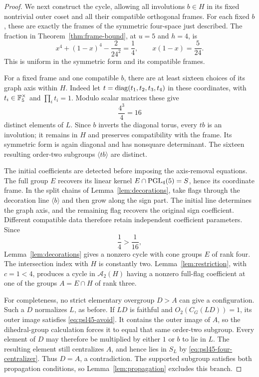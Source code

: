 \begin{proof}
We next construct the cycle, allowing all involutions $b\in H$
in its fixed nontrivial outer coset and all their compatible
orthogonal frames. For each fixed $b$, these are exactly the
frames of the symmetric four-space just described. The fraction
in Theorem~\ref{thm:frame-bound}, at $u=5$ and $h=4$, is
\[
 x^4+(1-x)^4-\frac{2}{24^2}=\frac14,
 \qquad x(1-x)=\frac5{24}.
\]
This is uniform in the symmetric form and its compatible frames.

For a fixed frame and one compatible $b$, there are at least
sixteen choices of its graph axis within $H$. Indeed let
$t=\operatorname{diag}(t_1,t_2,t_3,t_4)$ in these coordinates, with
$t_i\in\mathbb F_5^\times$ and $\prod_i t_i=1$.
Modulo scalar matrices these give
\[
 \frac{4^3}{4}=16
\]
distinct elements of $L$. Since $b$ inverts the diagonal torus,
every $tb$ is an involution; it remains in $H$ and preserves
compatibility with the frame. Its symmetric form is again
diagonal and has nonsquare determinant. The sixteen resulting
order-two subgroups $\langle tb\rangle$ are distinct.

The initial coefficients are detected before imposing the
axis-removal equations. The full group $E$ recovers its linear
kernel $E\cap\operatorname{PGL}_4(5)=S$, hence its coordinate frame. In the
split chains of Lemma~\ref{lem:decorations}, take flags through
the decoration line $\langle b\rangle$ and then grow along the
sign part. The initial line determines the graph axis, and the
remaining flag recovers the original sign coefficient. Different
compatible data therefore retain independent coefficient
parameters. Since
\[
 \frac14>\frac1{16},
\]
Lemma~\ref{lem:decorations} gives a nonzero cycle with cone groups
$E$ of rank four. The intersection index with $H$ is constantly
two. Lemma~\ref{lem:restriction}, with $c=1<4$, produces a cycle
in $\mathcal A_2(H)$ having a nonzero full-flag coefficient at
one of the groups $A=E\cap H$ of rank three.

For completeness, no strict elementary overgroup $D>A$ can
give a configuration. Such a $D$ normalizes $L$, as before.
If $LD$ is faithful and $O_2(C_G(LD))=1$, its outer image
satisfies \eqref{eq:psl45-avoid}. It contains the outer image of
$A$, so the dihedral-group calculation forces it to equal that
same order-two subgroup. Every element of $D$ may therefore
be multiplied by either $1$ or $b$ to lie in $L$. The resulting
element still centralizes $A$, and hence lies in $S_L$ by
\eqref{eq:psl45-four-centralizer}. Thus $D=A$, a contradiction.
The supported subgroup satisfies both propagation conditions,
so Lemma~\ref{lem:propagation} excludes this branch.


\end{proof}
